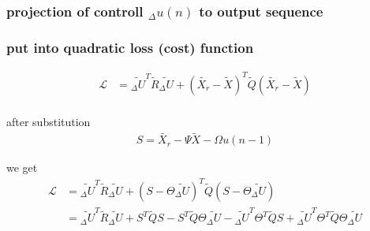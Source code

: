 \documentclass{beamer}
\begin{document}
\begin{frame}
  
  \frametitle{\bf projection of controll $_\Delta u(n)$ to output sequence}


\end{frame}




\begin{frame}
  
  \frametitle{\bf put into quadratic loss (cost) function}

  \begin{align*}
    \mathcal{L} &= \tilde{_\Delta U}^T \tilde{R} \tilde{_\Delta U} 
                + (\tilde{X_r} - \tilde{X})^T \tilde{Q} (\tilde{X_r} - \tilde{X}) \\
  \end{align*}

  after substitution
  \begin{align*}
    S = \tilde{X_r} - \Psi\tilde{X} - \Omega u(n-1)
  \end{align*}

  we get
  \begin{align*}
    \mathcal{L} &= \tilde{_\Delta U}^T \tilde{R} \tilde{_\Delta U} + (S -  \Theta \tilde{_\Delta U} )^T \tilde{Q} (S -  \Theta \tilde{_\Delta U} ) \\
                &= \tilde{_\Delta U}^T \tilde{R} \tilde{_\Delta U} 
                + S^T\tilde{Q}S - S^T \tilde{Q} \Theta \tilde{_\Delta U} 
                - \tilde{_\Delta U}^T \Theta^T\tilde{Q}S + \tilde{_\Delta U}^T\Theta^T\tilde{Q}\Theta\tilde{_\Delta U}
  \end{align*}

\end{frame}
\end{document}
